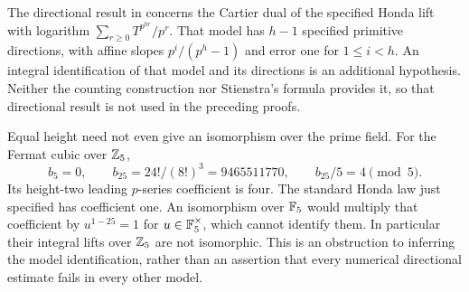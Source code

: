 The directional result in \citet[\S6]{fg-invariant-derivatives} concerns
the Cartier dual of the specified Honda lift with logarithm
$\sum_{r\ge0}T^{p^{hr}}/p^r$. That model has $h-1$ specified primitive
directions, with affine slopes $p^i/(p^h-1)$ and error one for
$1\le i<h$. An integral identification of that model and its directions
is an additional hypothesis. Neither the counting construction nor
Stienstra's formula provides it, so that directional result is not used
in the preceding proofs.

Equal height need not even give an isomorphism over the prime field.
For the Fermat cubic over $\mathbb Z_5$,
\[
 b_5=0,\qquad b_{25}=24!/(8!)^3=9465511770,\qquad
 b_{25}/5=4\pmod5.
\]
Its height-two leading $p$-series coefficient is four. The standard
Honda law just specified has coefficient one. An isomorphism over
$\mathbb F_5$ would multiply that coefficient by $u^{1-25}=1$ for
$u\in\mathbb F_5^\times$, which cannot identify them. In particular their
integral lifts over $\mathbb Z_5$ are not isomorphic. This is an obstruction
to inferring the model identification, rather than an assertion that
every numerical directional estimate fails in every other model.
